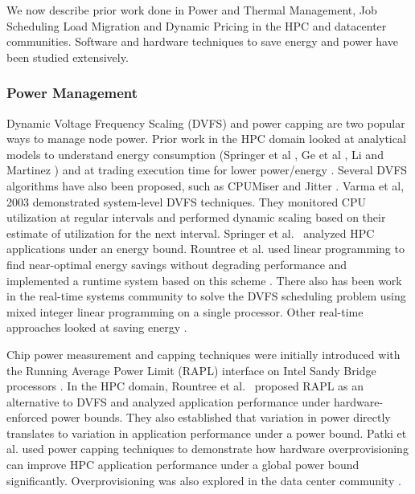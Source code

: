 We now describe prior work done in Power and Thermal Management, Job Scheduling Load 
Migration and Dynamic Pricing in the HPC and datacenter communities. Software and hardware 
techniques to save energy and power have been studied extensively. 

\subsubsection{Power Management}
Dynamic Voltage Frequency Scaling (DVFS) and power capping are two popular ways
to manage node power. Prior work in the HPC domain looked at analytical models
to understand energy consumption (Springer et al \cite{SpringerPPoPP2006}, Ge et
al \cite{GeICPP2007}, Li and Martinez \cite{LiHPCA2006}) and at trading
execution time for lower power/energy \cite{CameronSC2005,HsuSC2005}. Several
DVFS algorithms have also been proposed, such as CPUMiser \cite{GeICPP2007} and
Jitter \cite{KappiahSC2005}. Varma et al, 2003
\cite{varma_control-theoretic_2003} demonstrated system-level DVFS techniques.
They monitored CPU utilization at regular intervals and performed dynamic
scaling based on their estimate of utilization for the next interval. Springer
et al.~\cite{springer:06} analyzed HPC applications under an energy bound.
Rountree et al. used linear programming to find near-optimal energy savings
without degrading performance \cite{rountree:07} and implemented a runtime
system based on this scheme \cite{rountree:09}.  There also has been work in the
real-time systems community to solve the DVFS scheduling problem using mixed
integer linear programming on a single
processor\cite{IshiharaISLPED1998,SaputraLCTES2002,SwaminathanRTSS2000,SwaminathanASPDAC2001}.
Other real-time approaches looked at saving energy
\cite{MoncusiRTSS2003,MochockiICCAD2002,MochockiRTAS2005,ZhuTPDS2003,ZhangDAC2002}. 


Chip power measurement and capping techniques were initially introduced with the
Running Average Power Limit (RAPL) interface on Intel Sandy Bridge processors
\cite{IntelSDM,David2010}. In the HPC domain, Rountree et
al.~\cite{Rountree2012} proposed RAPL as an alternative to DVFS and analyzed
application performance under hardware-enforced power bounds. They also
established that variation in power directly translates to variation in
application performance under a power bound. Patki et al. \cite{Patki1} used
power capping techniques to demonstrate how hardware overprovisioning can
improve HPC application performance under a global power bound significantly.
Overprovisioning was also explored in the data center community \cite{femal:04}. 


